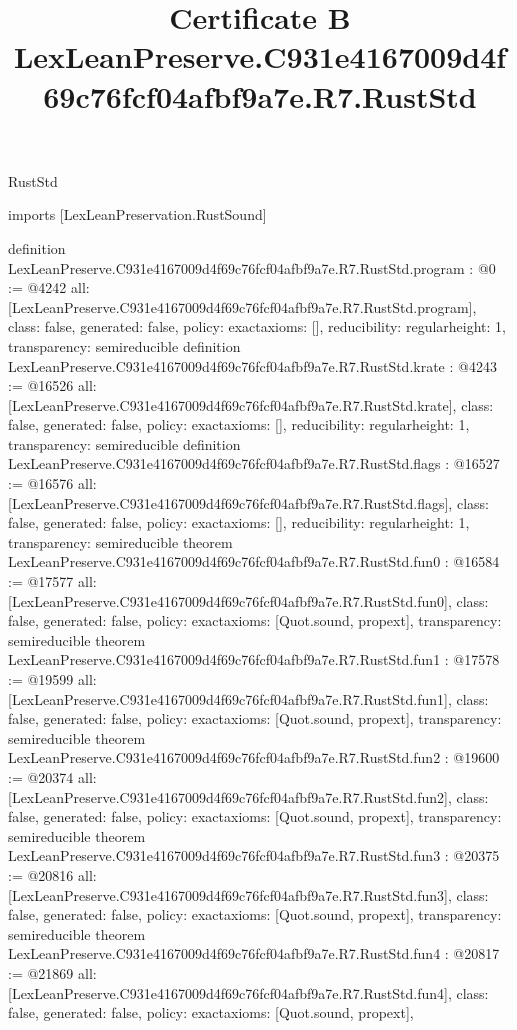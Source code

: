 \begin{lexlean}{RustStd}
\title{Certificate B LexLeanPreserve.C931e4167009d4f69c76fcf04afbf9a7e.R7.RustStd}
\begin{coremodule}
imports [LexLeanPreservation.RustSound]

definition LexLeanPreserve.C931e4167009d4f69c76fcf04afbf9a7e.R7.RustStd.program : @0 := @4242 {
  all: [LexLeanPreserve.C931e4167009d4f69c76fcf04afbf9a7e.R7.RustStd.program],
  class: false,
  generated: false,
  policy: exact{axioms: []},
  reducibility: regular{height: 1},
  transparency: semireducible
}
definition LexLeanPreserve.C931e4167009d4f69c76fcf04afbf9a7e.R7.RustStd.krate : @4243 := @16526 {
  all: [LexLeanPreserve.C931e4167009d4f69c76fcf04afbf9a7e.R7.RustStd.krate],
  class: false,
  generated: false,
  policy: exact{axioms: []},
  reducibility: regular{height: 1},
  transparency: semireducible
}
definition LexLeanPreserve.C931e4167009d4f69c76fcf04afbf9a7e.R7.RustStd.flags : @16527 := @16576 {
  all: [LexLeanPreserve.C931e4167009d4f69c76fcf04afbf9a7e.R7.RustStd.flags],
  class: false,
  generated: false,
  policy: exact{axioms: []},
  reducibility: regular{height: 1},
  transparency: semireducible
}
theorem LexLeanPreserve.C931e4167009d4f69c76fcf04afbf9a7e.R7.RustStd.fun0 : @16584 := @17577 {
  all: [LexLeanPreserve.C931e4167009d4f69c76fcf04afbf9a7e.R7.RustStd.fun0],
  class: false,
  generated: false,
  policy: exact{axioms: [Quot.sound, propext]},
  transparency: semireducible
}
theorem LexLeanPreserve.C931e4167009d4f69c76fcf04afbf9a7e.R7.RustStd.fun1 : @17578 := @19599 {
  all: [LexLeanPreserve.C931e4167009d4f69c76fcf04afbf9a7e.R7.RustStd.fun1],
  class: false,
  generated: false,
  policy: exact{axioms: [Quot.sound, propext]},
  transparency: semireducible
}
theorem LexLeanPreserve.C931e4167009d4f69c76fcf04afbf9a7e.R7.RustStd.fun2 : @19600 := @20374 {
  all: [LexLeanPreserve.C931e4167009d4f69c76fcf04afbf9a7e.R7.RustStd.fun2],
  class: false,
  generated: false,
  policy: exact{axioms: [Quot.sound, propext]},
  transparency: semireducible
}
theorem LexLeanPreserve.C931e4167009d4f69c76fcf04afbf9a7e.R7.RustStd.fun3 : @20375 := @20816 {
  all: [LexLeanPreserve.C931e4167009d4f69c76fcf04afbf9a7e.R7.RustStd.fun3],
  class: false,
  generated: false,
  policy: exact{axioms: [Quot.sound, propext]},
  transparency: semireducible
}
theorem LexLeanPreserve.C931e4167009d4f69c76fcf04afbf9a7e.R7.RustStd.fun4 : @20817 := @21869 {
  all: [LexLeanPreserve.C931e4167009d4f69c76fcf04afbf9a7e.R7.RustStd.fun4],
  class: false,
  generated: false,
  policy: exact{axioms: [Quot.sound, propext]},
}
\end{coremodule}
\end{lexlean}
